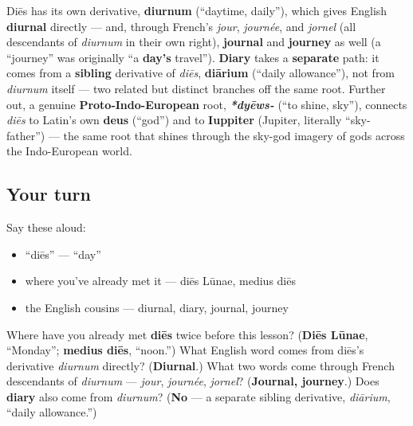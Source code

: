 \begin{cousinweb}
Diēs has its own derivative, \textbf{diurnum} (\textquotedblleft{}daytime, daily\textquotedblright{}), which gives English \textbf{diurnal} directly — and, through French's \emph{jour}, \emph{journée}, and \emph{jornel} (all descendants of \emph{diurnum} in their own right), \textbf{journal} and \textbf{journey} as well (a \textquotedblleft{}journey\textquotedblright{} was originally \textquotedblleft{}a \textbf{day's} travel\textquotedblright{}). \textbf{Diary} takes a \textbf{separate} path: it comes from a \textbf{sibling} derivative of \emph{diēs}, \textbf{diārium} (\textquotedblleft{}daily allowance\textquotedblright{}), not from \emph{diurnum} itself — two related but distinct branches off the same root. Further out, a genuine \textbf{Proto-Indo-European} root, \emph{\textbf{*dyēws-}} (\textquotedblleft{}to shine, sky\textquotedblright{}), connects \emph{diēs} to Latin's own \textbf{deus} (\textquotedblleft{}god\textquotedblright{}) and to \textbf{Iuppiter} (Jupiter, literally \textquotedblleft{}sky-father\textquotedblright{}) — the same root that shines through the sky-god imagery of gods across the Indo-European world.
\end{cousinweb}

\subsection*{Your turn}
Say these aloud:

\begin{itemize}
\raggedright
  \item \textquotedblleft{}diēs\textquotedblright{} — \textquotedblleft{}day\textquotedblright{}
  \item where you've already met it — diēs Lūnae, medius diēs
  \item the English cousins — diurnal, diary, journal, journey
\end{itemize}

\begin{tcolorbox}[breakable,colback=teal!4,colframe=teal!35!black,title={Before you move on}]
Where have you already met \textbf{diēs} twice before this lesson? (\textbf{Diēs Lūnae}, \textquotedblleft{}Monday\textquotedblright{}; \textbf{medius diēs}, \textquotedblleft{}noon.\textquotedblright{}) What English word comes from diēs's derivative \emph{diurnum} directly? (\textbf{Diurnal}.) What two words come through French descendants of \emph{diurnum} — \emph{jour}, \emph{journée}, \emph{jornel}? (\textbf{Journal, journey}.) Does \textbf{diary} also come from \emph{diurnum}? (\textbf{No} — a separate sibling derivative, \emph{diārium}, \textquotedblleft{}daily allowance.\textquotedblright{})
\end{tcolorbox}

